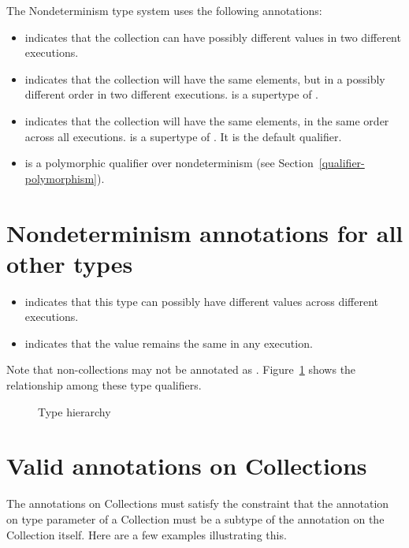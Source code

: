 The Nondeterminism type system uses the following annotations:
\begin{itemize}
\item
   indicates
  that the collection can have possibly different values in two different executions.
\item
   indicates that
  the collection will have the same elements, but in a possibly different order in two different executions.
   is a supertype of .
 \item
   indicates that
  the collection will have the same elements, in the same order across all executions.
   is a supertype of .
   It is the default qualifier.
\item
   is a
  polymorphic qualifier over nondeterminism (see Section~\ref{qualifier-polymorphism}).
\end{itemize}

\section{Nondeterminism annotations for all other types\label{nondeterminism-annotations-elements}}

\begin{itemize}
\item
   indicates
  that this type can possibly have different values across different executions.
 \item
   indicates that
  the value remains the same in any execution.
\end{itemize}

Note that non-collections may not be annotated as .
Figure~\ref{fig-hierarchy} shows the relationship among these
type qualifiers.

\begin{figure}[h]\caption{Type hierarchy}
	\begin{center}
	\end{center}
	\label{fig-hierarchy}
\end{figure}

\section{Valid annotations on Collections\label{type-validity}}
The annotations on Collections must satisfy the constraint that the annotation on type parameter of a Collection must be a
subtype of the annotation on the Collection itself. Here are a few examples illustrating this.

